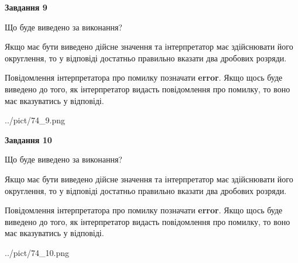 \documentclass[12pt, ukrainian]{article}
\begin{document}
{\begin {Large}
{\begin {center}\textbf{Завдання 9}\end {center}}\par
Що буде виведено за виконання? \par

Якщо має бути виведено дійсне значення та інтерпретатор має здійснювати його округлення, 
то у відповіді достатньо правильно вказати два дробових розряди.

Повідомлення інтерпретатора про помилку позначати \textbf{error}.
Якщо щось буде виведено до того, як інтерпретатор видасть повідомлення про помилку, 
то воно має вказуватись у відповіді. \par

\begin{center}
	{../pict/74_9.png}
\end{center}
\newpage

{\begin {center}\textbf{Завдання 10}\end {center}}\par
Що буде виведено за виконання? \par

Якщо має бути виведено дійсне значення та інтерпретатор має здійснювати його округлення, 
то у відповіді достатньо правильно вказати два дробових розряди.

Повідомлення інтерпретатора про помилку позначати \textbf{error}.
Якщо щось буде виведено до того, як інтерпретатор видасть повідомлення про помилку, 
то воно має вказуватись у відповіді. \par

\begin{center}
	{../pict/74_10.png}
\end{center}
\newpage

\end {Large}}
\end{document}
